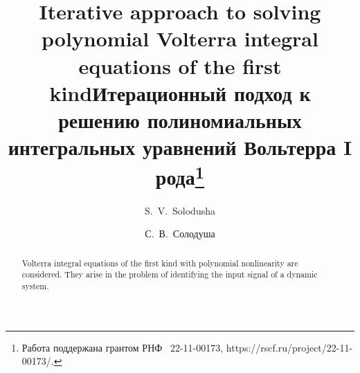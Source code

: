 \begin{englishtitle} %
\title{Iterative approach to solving polynomial Volterra integral equations of the first kind}
\author{S.~V.~Solodusha  }

\maketitle

\begin{abstract}
Volterra integral equations of the first kind with polynomial nonlinearity are considered. They arise in the problem of identifying the input signal of a dynamic system.

\end{abstract}
\end{englishtitle}

\iffalse
\documentclass[12pt]{llncs}


\usepackage{iftex}

\ifPDFTeX
\usepackage[T2A]{fontenc}
\usepackage[utf8]{inputenc} %
\usepackage[english,russian]{babel}
\fi

\usepackage{todonotes}

\usepackage[russian]{nla}



\fi

\title{Итерационный подход к решению полиномиальных интегральных уравнений Вольтерра I рода\thanks{Работа поддержана грантом РНФ \textnumero~22-11-00173, https://rscf.ru/project/22-11-00173/.}
}
\author{С.~В.~Солодуша %
} %


